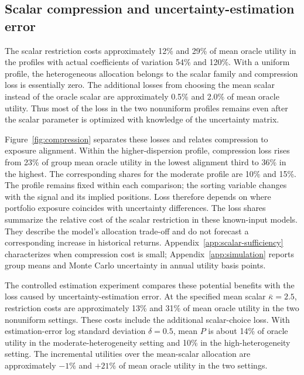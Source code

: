\subsection{Scalar compression and uncertainty-estimation error}
The scalar restriction costs approximately 12\% and 29\% of mean oracle utility in the profiles with actual coefficients of variation 54\% and 120\%. With a uniform profile, the heterogeneous allocation belongs to the scalar family and compression loss is essentially zero. The additional losses from choosing the mean scalar instead of the oracle scalar are approximately 0.5\% and 2.0\% of mean oracle utility. Thus most of the loss in the two nonuniform profiles remains even after the scalar parameter is optimized with knowledge of the uncertainty matrix.

Figure~\ref{fig:compression} separates these losses and relates compression to exposure alignment. Within the higher-dispersion profile, compression loss rises from 23\% of group mean oracle utility in the lowest alignment third to 36\% in the highest. The corresponding shares for the moderate profile are 10\% and 15\%. The profile remains fixed within each comparison; the sorting variable changes with the signal and its implied positions. Loss therefore depends on where portfolio exposure coincides with uncertainty differences. The loss shares summarize the relative cost of the scalar restriction in these known-input models. They describe the model's allocation trade-off and do not forecast a corresponding increase in historical returns. Appendix~\ref{app:scalar-sufficiency} characterizes when compression cost is small; Appendix~\ref{app:simulation} reports group means and Monte Carlo uncertainty in annual utility basis points.

The controlled estimation experiment compares these potential benefits with the loss caused by uncertainty-estimation error. At the specified mean scalar $\bar\kappa=2.5$, restriction costs are approximately 13\% and 31\% of mean oracle utility in the two nonuniform settings. These costs include the additional scalar-choice loss. With estimation-error log standard deviation $\delta=0.5$, mean $P$ is about 14\% of oracle utility in the moderate-heterogeneity setting and 10\% in the high-heterogeneity setting. The incremental utilities over the mean-scalar allocation are approximately $-1\%$ and $+21\%$ of mean oracle utility in the two settings.

